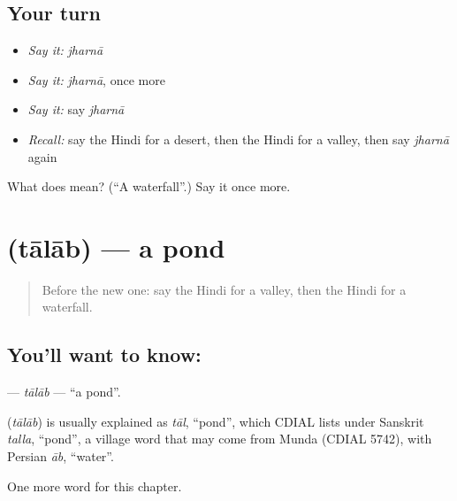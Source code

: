 \subsection*{Your turn}
\begin{itemize}
\raggedright
  \item \emph{Say it:} \emph{jharnā}
  \item \emph{Say it:} \emph{jharnā}, once more
  \item \emph{Say it:} say \emph{jharnā}
  \item \emph{Recall:} say the Hindi for a desert, then the Hindi for a valley, then say \emph{jharnā} again
\end{itemize}

\begin{tcolorbox}[breakable,colback=teal!4,colframe=teal!35!black,title={Before you move on}]
What does  mean? (\textquotedblleft{}A waterfall\textquotedblright{}.) Say it once more.
\end{tcolorbox}
\section[\texorpdfstring{\hi{तालाब} (tālāb)}{तालाब (tālāb)}]{ (tālāb) — a pond}

\label{lesson:HI-C201-talab}



\begin{quote}
Before the new one: say the Hindi for a valley, then the Hindi for a waterfall.
\end{quote}

\subsection*{You'll want to know: }
\textbf{} — \emph{tālāb} — \textquotedblleft{}a pond\textquotedblright{}.

\begin{cousinweb}
\textbf{} (\emph{tālāb}) is usually explained as \emph{tāl}, \textquotedblleft{}pond\textquotedblright{}, which CDIAL lists under Sanskrit \emph{talla}, \textquotedblleft{}pond\textquotedblright{}, a village word that may come from Munda (CDIAL 5742), with Persian \emph{āb}, \textquotedblleft{}water\textquotedblright{}.
\end{cousinweb}

\begin{grammarlens}[title={What you've built}]
One more word for this chapter.
\end{grammarlens}

